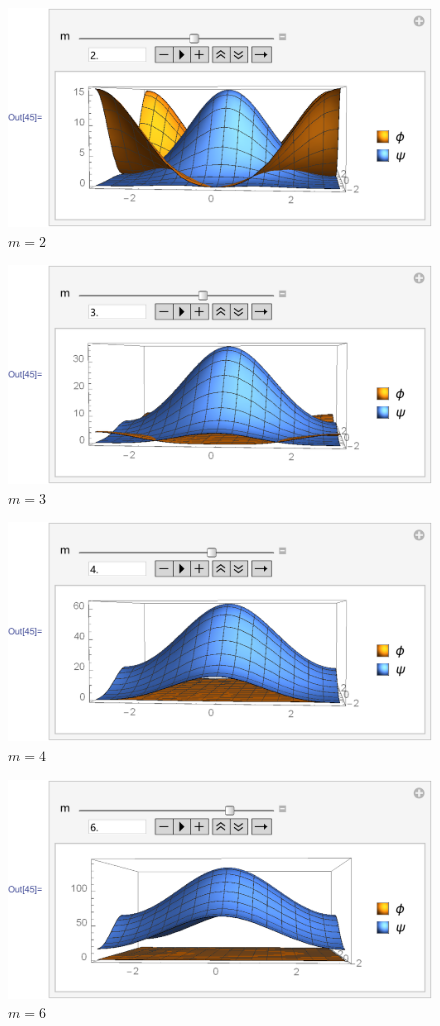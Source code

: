 \documentclass{article}
\begin{document}
\begin{figure}[H]
    \centering
    \includegraphics[width=0.6\linewidth]{pics/OpenBC-inXY/Eigen-m2.pdf}
    \caption{$m=2$}
\end{figure}
\begin{figure}[H]
    \centering
    \includegraphics[width=0.6\linewidth]{pics/OpenBC-inXY/Eigen-m3.pdf}
    \caption{$m=3$}
\end{figure}
\begin{figure}[H]
    \centering
    \includegraphics[width=0.6\linewidth]{pics/OpenBC-inXY/Eigen-m4.pdf}
    \caption{$m=4$}
\end{figure}
\begin{figure}[H]
    \centering
    \includegraphics[width=0.6\linewidth]{pics/OpenBC-inXY/Eigen-m6.pdf}
    \caption{$m=6$}
\end{figure}
\end{document}
